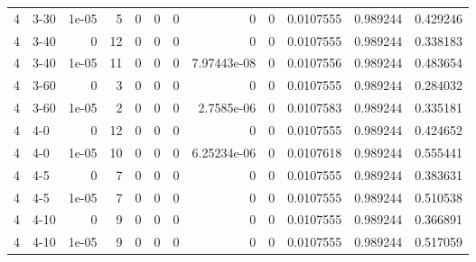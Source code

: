 \begin{tabular}{rlrrrrrrrrrr}
     4 & 3-30   &      1e-05 &           5 &                 0 &                 0 &     0           &     0           &      0           &        0.0107555 &               0.989244 &           0.429246 \\
     4 & 3-40   &      0     &          12 &                 0 &                 0 &     0           &     0           &      0           &        0.0107555 &               0.989244 &           0.338183 \\
     4 & 3-40   &      1e-05 &          11 &                 0 &                 0 &     0           &     7.97443e-08 &      0           &        0.0107556 &               0.989244 &           0.483654 \\
     4 & 3-60   &      0     &           3 &                 0 &                 0 &     0           &     0           &      0           &        0.0107555 &               0.989244 &           0.284032 \\
     4 & 3-60   &      1e-05 &           2 &                 0 &                 0 &     0           &     2.7585e-06  &      0           &        0.0107583 &               0.989244 &           0.335181 \\
     4 & 4-0    &      0     &          12 &                 0 &                 0 &     0           &     0           &      0           &        0.0107555 &               0.989244 &           0.424652 \\
     4 & 4-0    &      1e-05 &          10 &                 0 &                 0 &     0           &     6.25234e-06 &      0           &        0.0107618 &               0.989244 &           0.555441 \\
     4 & 4-5    &      0     &           7 &                 0 &                 0 &     0           &     0           &      0           &        0.0107555 &               0.989244 &           0.383631 \\
     4 & 4-5    &      1e-05 &           7 &                 0 &                 0 &     0           &     0           &      0           &        0.0107555 &               0.989244 &           0.510538 \\
     4 & 4-10   &      0     &           9 &                 0 &                 0 &     0           &     0           &      0           &        0.0107555 &               0.989244 &           0.366891 \\
     4 & 4-10   &      1e-05 &           9 &                 0 &                 0 &     0           &     0           &      0           &        0.0107555 &               0.989244 &           0.517059 \\

\end{tabular}
